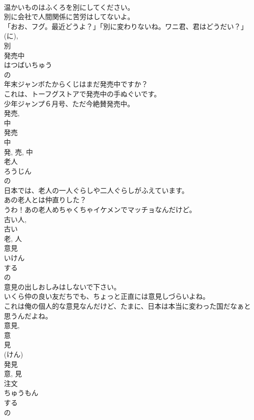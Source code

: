\documentclass[8pt]{extreport}
\begin{document}
\begin{CJK}{UTF8}{min}
\\	温かいものはふくろを別にしてください。	
\\	別に会社で人間関係に苦労はしてないよ。	
\\	「おお、フグ。最近どうよ？」「別に変わりないね。ワニ君、君はどうだい？」	
\\	(に), 
\\	別	
\\	発売中	
\\	はつばいちゅう	
\\	の 
\\	年末ジャンボたからくじはまだ発売中ですか？	
\\	これは、トーフグストアで発売中の手ぬぐいです。	
\\	少年ジャンプ６月号、ただ今絶賛発売中。	
\\	発売, 
\\	中 
\\	発売 
\\	中 
\\	発, 売, 中	
\\	老人	
\\	ろうじん	
\\	の 
\\	日本では、老人の一人ぐらしや二人ぐらしがふえています。	
\\	あの老人とは仲直りした？	
\\	うわ！あの老人めちゃくちゃイケメンでマッチョなんだけど。	
\\	古い人, 
\\	古い 
\\	老, 人	
\\	意見	
\\	いけん	
\\	する 
\\	の 
\\	意見の出しおしみはしないで下さい。	
\\	いくら仲の良い友だちでも、ちょっと正直には意見しづらいよね。	
\\	これは俺の個人的な意見なんだけど、たまに、日本は本当に変わった国だなぁと思うんだよね。	
\\	意見, 
\\	意 
\\	見
\\	(けん) 
\\	発見 
\\	意, 見	
\\	注文	
\\	ちゅうもん	
\\	する 
\\	の 

\end{CJK}
\end{document}
